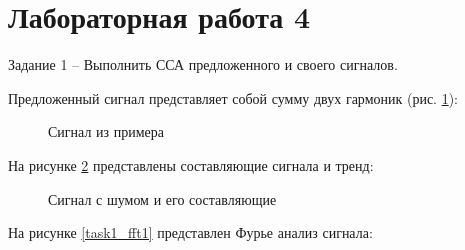 \documentclass[a4paper,oneside,14pt]{extreport}
\begin{document}


\chapter*{Лабораторная работа 4}

Задание 1 – Выполнить ССА предложенного и своего сигналов.

Предложенный сигнал представляет собой сумму двух гармоник (рис. \ref{task1_garm1}):

\begin{figure}[!h]
	\caption{Сигнал из примера}
	\label{task1_garm1}
\end{figure}

На рисунке \ref{task1_signal1} представлены составляющие сигнала и тренд:

\begin{figure}[!h]
	\caption{Сигнал с шумом и его составляющие}
	\label{task1_signal1}
\end{figure}

\newpage
На рисунке \ref{task1_fft1} представлен Фурье анализ сигнала:
\end{document}
